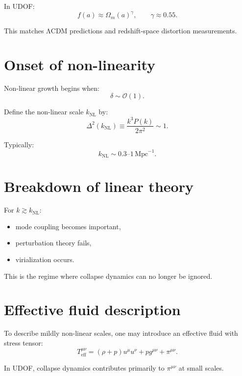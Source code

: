 \documentclass[11pt]{book}
\begin{document}
In UDOF:
\begin{equation}
f(a) \approx \Omega_m(a)^\gamma,
\qquad
\gamma \approx 0.55.
\end{equation}

This matches ΛCDM predictions and redshift-space distortion measurements.

\section{Onset of non-linearity}

Non-linear growth begins when:
\begin{equation}
\delta \sim \mathcal{O}(1).
\end{equation}

Define the non-linear scale $k_{\mathrm{NL}}$ by:
\begin{equation}
\Delta^2(k_{\mathrm{NL}}) \equiv \frac{k^3 P(k)}{2\pi^2} \sim 1.
\end{equation}

Typically:
\begin{equation}
k_{\mathrm{NL}} \sim 0.3\text{--}1\,\mathrm{Mpc}^{-1}.
\end{equation}

\section{Breakdown of linear theory}

For $k \gtrsim k_{\mathrm{NL}}$:
\begin{itemize}
\item mode coupling becomes important,
\item perturbation theory fails,
\item virialization occurs.
\end{itemize}

This is the regime where collapse dynamics can no longer be ignored.

\section{Effective fluid description}

To describe mildly non-linear scales, one may introduce an effective
fluid with stress tensor:
\begin{equation}
T^{\mu\nu}_{\mathrm{eff}} =
(\rho + p)u^\mu u^\nu + p g^{\mu\nu} + \pi^{\mu\nu}.
\end{equation}

In UDOF, collapse dynamics contributes primarily to $\pi^{\mu\nu}$
at small scales.
\end{document}
